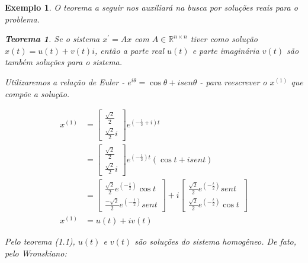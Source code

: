 \documentclass[a4paper,portuguese,9pt,final]{extarticle}
\newtheorem{theorem}{Teorema}[section]
\newtheorem{example}{Exemplo}[section]
\providecommand{\sin}{} \renewcommand{\sin}{sen}
\begin{document}
\begin{multicols*}{2}
\begin{example}
                O teorema a seguir nos auxiliará na busca por soluções reais para o problema.
                
                \begin{theorem}
                    Se o sistema $x^\prime = Ax$ com $A \in \mathbb{R}^{n \times n}$ tiver como solução $x(t) = u(t)+v(t)i$, então a parte real $u(t)$ e parte imaginária $v(t)$ são também soluções para o sistema.
                \end{theorem}
                
                Utilizaremos a relação de Euler - $e^{i\theta}= \cos{\theta} + i\sin{\theta}$ - para reescrever o $x^{(1)}$ que compõe a solução.
                
                \begin{equation*}
                    \begin{split}
                        x^{(1)} &= \begin{bmatrix} \frac{\sqrt{2}}{2} \\ \frac{\sqrt{2}}{2}i \end{bmatrix} e^{(-\frac{1}{2}+i)t} \\
                        &= \begin{bmatrix} \frac{\sqrt{2}}{2} \\ \frac{\sqrt{2}}{2}i \end{bmatrix} e^{(-\frac{1}{2})t}(\cos{t}+i\sin{t}) \\
                        & = \begin{bmatrix} \frac{\sqrt{2}}{2}e^{(-\frac{t}{2})}\cos{t} \\ \frac{-\sqrt{2}}{2}e^{(-\frac{t}{2})}\sin{t} \end{bmatrix} + i \begin{bmatrix} \frac{\sqrt{2}}{2}e^{(-\frac{t}{2})}\sin{t} \\ \frac{\sqrt{2}}{2}e^{(-\frac{t}{2})}\cos{t} \end{bmatrix} \\
                        x^{(1)} &= u(t) +iv(t)
                    \end{split}
                \end{equation*}
                
                Pelo teorema (1.1), $u(t)$ e $v(t)$ são soluções do sistema homogêneo. De fato, pelo Wronskiano:
                

\end{example}
\end{multicols*}
\end{document}

